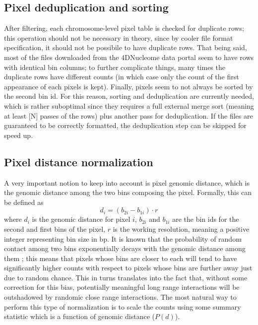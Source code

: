 \subsection{Pixel deduplication and sorting}

After filtering, each chromosome-level pixel table is checked for duplicate rows; this operation should not be necessary in theory, since by cooler file format specification, it should not be possibile to have duplicate rows. That being said, most of the files downloaded from the 4DNucleome data portal seem to have rows with identical bin columns; to further complicate things, many times the duplicate rows have different counts (in which case only the count of the first appearance of each pixels is kept). Finally, pixels seem to not always be sorted by the second bin id. For this reason, sorting and deduplication are currently needed, which is rather suboptimal since they requires a full external merge sort (meaning at least [N] passes of the rows) plus another pass for deduplication. If the files are guaranteed to be correctly formatted, the deduplication step can be skipped for speed up.


\subsection{Pixel distance normalization}


A very important notion to keep into account is pixel genomic distance, which is the genomic distance among the two bins composing the pixel. Formally, this can be defined as 
$$d_i = (b_{2i} - b_{1i}) \cdot r$$
where $d_i$ is the genomic distance for pixel $i$, $b_{2i}$ and $b_{1i}$ are the bin ids for the second and first bins of the pixel, $r$ is the working resolution, meaning a positive integer representing bin size in bp. It is known that the probability of random contact among two bins exponentially decays with the genomic distance among them \cite{distancedecay2009}; this means that pixels whose bins are closer to each will tend to have significantly higher counts with respect to pixels whose bins are further away just due to random chance. This in turns translates into the fact that, without some correction for this bias, potentially meaningful long range interactions will be outshadowed by randomic close range interactions. The most natural way to perform this type of normalization is to scale the counts using some summary statistic which is a function of genomic distance ($P(d)$).

